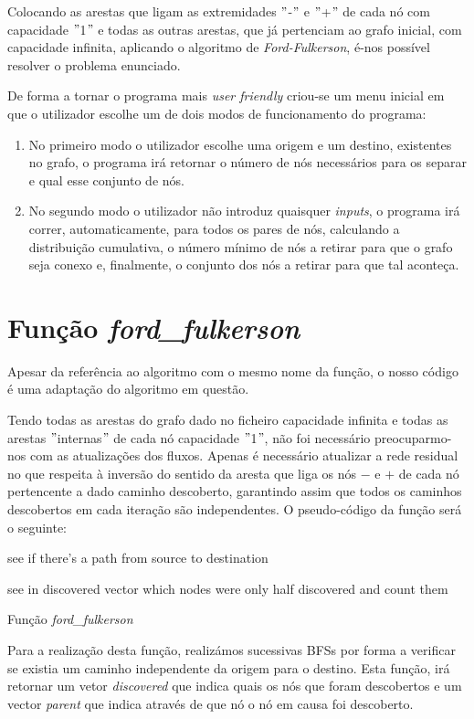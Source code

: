 \documentclass[a4paper]{article}
\begin{document}
Colocando as arestas que ligam as extremidades $"$-$"$ e $"$+$"$  de cada nó com capacidade $"$1$"$ e todas as outras arestas, que já pertenciam ao grafo inicial, com capacidade infinita, aplicando o algoritmo de \textit{Ford-Fulkerson}, é-nos possível resolver o problema enunciado.

De forma a tornar o programa mais \textit{user friendly} criou-se um menu inicial em que o utilizador escolhe um de dois modos de funcionamento do programa:

\begin{enumerate}
	\item No primeiro modo o utilizador escolhe uma origem e um destino, existentes no grafo, o programa irá retornar o número de nós necessários para os separar e qual esse conjunto de nós.
	\item No segundo modo o utilizador não introduz quaisquer \textit{inputs}, o programa irá correr, automaticamente, para todos os pares de nós, calculando a distribuição cumulativa, o número mínimo de nós a retirar para que o grafo seja conexo e, finalmente, o conjunto dos nós a retirar para que tal aconteça.
\end{enumerate}


\section{Função \textit{ford\_fulkerson}}
Apesar da referência ao algoritmo com o mesmo nome da função, o nosso código é uma adaptação do algoritmo em questão.

Tendo todas as arestas do grafo dado no ficheiro capacidade infinita e todas as arestas $"$internas$"$ de cada nó capacidade $"$1$"$, não foi necessário preocuparmo-nos com as atualizações dos fluxos. Apenas é necessário atualizar a rede residual no que respeita à inversão do sentido da aresta que liga os nós $-$ e $+$ de cada nó pertencente a dado caminho descoberto, garantindo assim que todos os caminhos descobertos em cada iteração são independentes.
\vskip 5mm
O pseudo-código da função será o seguinte:
\vskip 2mm
\begin{algorithm}[H]
	see if there's a path from source to destination\;
	
	
	see in discovered vector which nodes were only half discovered and count them\;
	
 \caption{Função \textit{ford\_fulkerson}}
\end{algorithm}
\vskip 5mm
Para a realização desta função, realizámos sucessivas BFSs por forma a verificar se existia um caminho independente da origem para o destino. Esta função, irá retornar um vetor \textit{discovered} que indica quais os nós que foram descobertos e um vector \textit{parent} que indica através de que nó o nó em causa foi descoberto.
\end{document}
